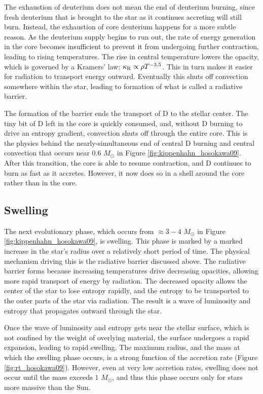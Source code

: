 The exhaustion of deuterium does not mean the end of deuterium burning, since fresh deuterium that is brought to the star as it continues accreting will still burn. Instead, the exhaustion of core deuterium happens for a more subtle reason. As the deuterium supply begins to run out, the rate of energy generation in the core becomes insufficient to prevent it from undergoing further contraction, leading to rising temperatures. The rise in central temperature lowers the opacity, which is governed by a Kramers' law: $\kappa_{\rm R} \propto \rho T^{-3.5}$. This in turn makes it easier for radiation to transport energy outward. Eventually this shuts off convection somewhere within the star, leading to formation of what is called a radiative barrier.

The formation of the barrier ends the transport of D to the stellar center. The tiny bit of D left in the core is quickly consumed, and, without D burning to drive an entropy gradient, convection shuts off through the entire core. This is the physics behind the nearly-simultaneous end of central D burning and central convection that occurs near $0.6$ $M_\odot$ in Figure \ref{fig:kippenhahn_hosokawa09}. After this transition, the core is able to resume contraction, and D continues to burn as fast as it accretes. However, it now does so in a shell around the core rather than in the core.

\subsection{Swelling}

The next evolutionary phase, which occurs from $\approx 3-4$ $M_\odot$ in Figure \ref{fig:kippenhahn_hosokawa09}, is swelling. This phase is marked by a marked increase in the star's radius over a relatively short period of time. The physical mechanism driving this is the radiative barrier discussed above. The radiative barrier forms because increasing temperatures drive decreasing opacities, allowing more rapid transport of energy by radiation. The decreased opacity allows the center of the star to lose entropy rapidly, and the entropy to be transported to the outer parts of the star via radiation. The result is a wave of luminosity and entropy that propagates outward through the star.

Once the wave of luminosity and entropy gets near the stellar surface, which is not confined by the weight of overlying material, the surface undergoes a rapid expansion, leading to rapid swelling. The maximum radius, and the mass at which the swelling phase occurs, is a strong function of the accretion rate (Figure \ref{fig:rt_hosokawa09}). However, even at very low accretion rates, swelling does not occur until the mass exceeds $1$ $M_\odot$, and thus this phase occurs only for stars more massive than the Sun.

